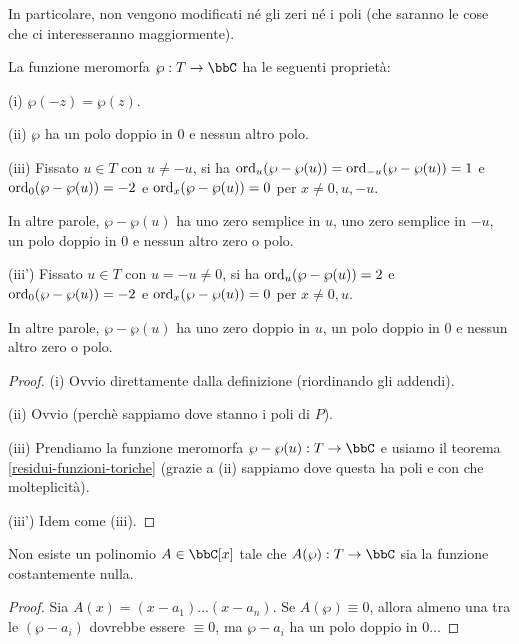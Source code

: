 In particolare, non vengono modificati né gli zeri né i poli (che saranno le cose che ci interesseranno maggiormente).


\begin{proposizione}
La funzione meromorfa $\wp:T\rar\bbC$ ha le seguenti proprietà:

(i) $\wp(-z)=\wp(z)$.

(ii) $\wp$ ha un polo doppio in $0$ e nessun altro polo.

(iii) Fissato $u\in T$ con $u\not=-u$, si ha $\text{ord}_u(\wp-\wp(u))=\text{ord}_{-u}(\wp-\wp(u))=1$ e $\text{ord}_0(\wp-\wp(u))=-2$ e $\text{ord}_x(\wp-\wp(u))=0$ per $x\not=0,u,-u$.

In altre parole, $\wp-\wp(u)$ ha uno zero semplice in $u$, uno zero semplice in $-u$, un polo doppio in $0$ e nessun altro zero o polo.

(iii') Fissato $u\in T$ con $u=-u\not=0$, si ha $\text{ord}_u(\wp-\wp(u))=2$ e $\text{ord}_0(\wp-\wp(u))=-2$ e $\text{ord}_x(\wp-\wp(u))=0$ per $x\not=0,u$.

In altre parole, $\wp-\wp(u)$ ha uno zero doppio in $u$, un polo doppio in $0$ e nessun altro zero o polo.
\end{proposizione}
\begin{proof}
(i) Ovvio direttamente dalla definizione (riordinando gli addendi).

(ii) Ovvio (perchè sappiamo dove stanno i poli di $P$).

(iii) Prendiamo la funzione meromorfa $\wp-\wp(u):T\rar\bbC$ e usiamo il teorema \ref{residui-funzioni-toriche} (grazie a (ii) sappiamo dove questa ha poli e con che molteplicità).

(iii') Idem come (iii).
\end{proof}


\begin{teorema}
Non esiste un polinomio $A\in\bbC[x]$ tale che $A(\wp):T\rar\bbC$ sia la funzione costantemente nulla.
\end{teorema}
\begin{proof}
Sia $A(x)=(x-a_1)...(x-a_n)$. Se $A(\wp)\equiv0$, allora almeno una tra le $(\wp-a_i)$ dovrebbe essere $\equiv0$, ma $\wp-a_i$ ha un polo doppio in $0$...
\end{proof}


